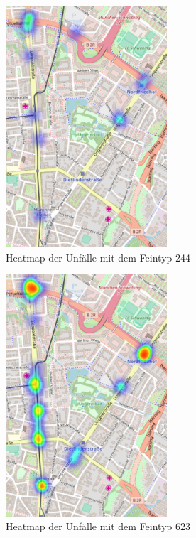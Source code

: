 \begin{savenotes}
	\begin{figure}[H]
		\centering
		\includegraphics[width=6cm,height=9cm]{figures/HM_244}
		\caption[Heatmap der Unfälle mit dem Feintyp 244]{Heatmap der Unfälle mit dem Feintyp 244}\label{fig:Heatmap_244}
	\end{figure}
\end{savenotes}

\begin{savenotes}
	\begin{figure}[H]
		\centering
		\includegraphics[width=6cm,height=9cm]{figures/HM_623}
		\caption[Heatmap der Unfälle mit dem Feintyp 623]{Heatmap der Unfälle mit dem Feintyp 623}\label{fig:Heatmap_623}
	\end{figure}
\end{savenotes}

